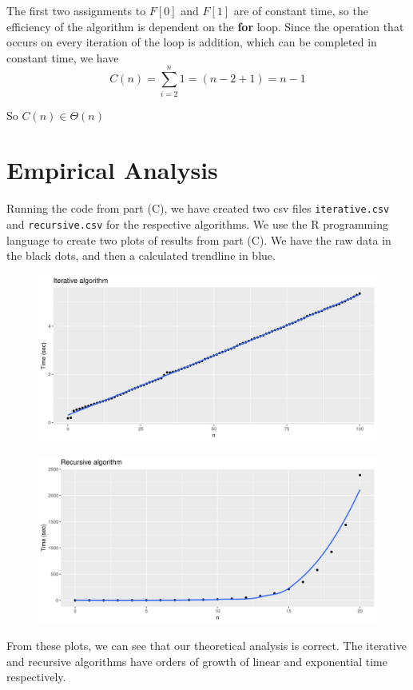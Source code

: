 \documentclass[letterpaper, 11pt]{article}
\begin{document}
The first two assignments to \(F[0]\) and \(F[1]\) are of constant time, so the
efficiency of the algorithm is dependent on the \textbf{for} loop. Since the 
operation that occurs on every iteration of the loop is addition, which can be
completed in constant time, we have
\[C(n) = \sum_{i = 2}^{n} 1 = (n - 2 + 1) = n - 1\]

So \(C(n) \in \Theta(n)\)

\newpage

\section*{Empirical Analysis}
Running the code from part (C), we have created two csv files
\texttt{iterative.csv} and \texttt{recursive.csv} for the respective
algorithms. We use the R programming language to create two plots of results
from part (C). We have the raw data in the black dots, and then a calculated
trendline in blue.  

\begin{figure}[h]
    \includegraphics[width=\linewidth]{iterative_plot.png}
\end{figure}

\begin{figure}[h]
    \includegraphics[width=\linewidth]{recursive_plot.png}
\end{figure}

From these plots, we can see that our theoretical analysis is correct. The
iterative and recursive algorithms have orders of growth of linear and
exponential time respectively. 
\end{document}

